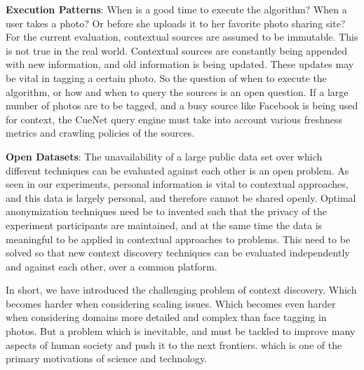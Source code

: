 \textbf{\textbf{Execution Patterns}}: When is a good time to execute the algorithm? When a user takes a photo? Or before she uploads it to her favorite photo sharing site? For the current evaluation, contextual sources are assumed to be immutable. This is not true in the real world. Contextual sources are constantly being appended with new information, and old information is being updated. These updates may be vital in tagging a certain photo. So the question of when to execute the algorithm, or how and when to query the sources is an open question. If a large number of photos are to be tagged, and a busy source like Facebook is being used for context, the CueNet query engine must take into account various freshness metrics and crawling policies of the sources. 

\textbf{\textbf{Open Datasets}}: The unavailability of a large public data set over which different techniques can be evaluated against each other is an open problem. As seen in our experiments, personal information is vital to contextual approaches, and this data is largely personal, and therefore cannot be shared openly. Optimal anonymization techniques need be to invented such that the privacy of the experiment participants are maintained, and at the same time the data is meaningful to be applied in contextual approaches to problems. This need to be solved so that new context discovery techniques can be evaluated independently and against each other, over a common platform.

In short, we have introduced the challenging problem of context discovery. Which becomes harder when considering scaling issues. Which becomes even harder when considering domains more detailed and complex than face tagging in photos. But a problem which is inevitable, and must be tackled to improve many aspects of human society and push it to the next frontiers. which is one of the primary motivations of science and technology.